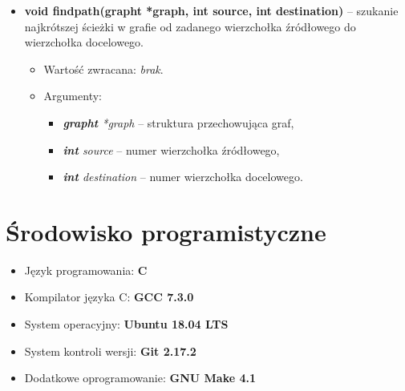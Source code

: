 \documentclass{article}
\begin{document}
\begin{itemize}
    \item \textbf{void find\textunderscore path(graph\textunderscore t *graph, int source, int destination)} -- szukanie najkrótszej ścieżki w grafie od zadanego wierzchołka źródłowego \linebreak do wierzchołka docelowego.
    \begin{itemize}
        \item Wartość zwracana: \textit{brak}.
        \item Argumenty:
            \begin{itemize}
                \item \textit{\textbf{graph\textunderscore t} *graph} -- struktura przechowująca graf,
                \item \textit{\textbf{int} source} -- numer wierzchołka źródłowego,
                \item \textit{\textbf{int} destination} -- numer wierzchołka docelowego.
            \end{itemize}
    \end{itemize}
\end{itemize}

\section{Środowisko programistyczne}
\begin{itemize}
    \item Język programowania: \textbf{C}
    \item Kompilator języka C: \textbf{GCC 7.3.0}
    \item System operacyjny: \textbf{Ubuntu 18.04 LTS}
    \item System kontroli wersji: \textbf{Git 2.17.2}
    \item Dodatkowe oprogramowanie: \textbf{GNU Make 4.1}
\end{itemize}
\end{document}
